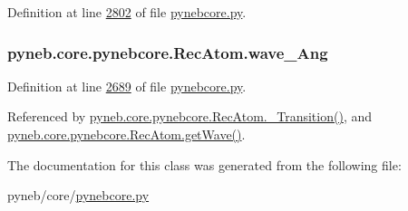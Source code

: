 Definition at line \hyperlink{pynebcore_8py_source_l02802}{2802} of file \hyperlink{pynebcore_8py_source}{pynebcore.\-py}.

\hypertarget{classpyneb_1_1core_1_1pynebcore_1_1_rec_atom_aa2fd61021ea3067af77e7ee0053ace11}{
\subsubsection[{wave\-\_\-\-Ang}]{\setlength{\rightskip}{0pt plus 5cm}pyneb.\-core.\-pynebcore.\-Rec\-Atom.\-wave\-\_\-\-Ang}}\label{classpyneb_1_1core_1_1pynebcore_1_1_rec_atom_aa2fd61021ea3067af77e7ee0053ace11}


Definition at line \hyperlink{pynebcore_8py_source_l02689}{2689} of file \hyperlink{pynebcore_8py_source}{pynebcore.\-py}.



Referenced by \hyperlink{pynebcore_8py_source_l02812}{pyneb.\-core.\-pynebcore.\-Rec\-Atom.\-\_\-\-Transition()}, and \hyperlink{pynebcore_8py_source_l02699}{pyneb.\-core.\-pynebcore.\-Rec\-Atom.\-get\-Wave()}.



The documentation for this class was generated from the following file\-:\begin{DoxyCompactItemize}
\item 
pyneb/core/\hyperlink{pynebcore_8py}{pynebcore.\-py}\end{DoxyCompactItemize}
